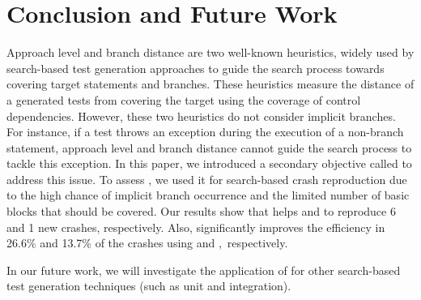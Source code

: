 \section{Conclusion and Future Work} 
\label{sec:bbc:confut}

Approach level and branch distance are two well-known heuristics, widely used by search-based test generation approaches to guide the search process towards covering target statements and branches. These heuristics measure the distance of a generated tests from covering the target using the coverage of control dependencies. However, these two heuristics do not consider implicit branches. For instance, if a test throws an exception during the execution of a non-branch statement, approach level and branch distance cannot guide the search process to tackle this exception. In this paper, we introduced a secondary objective called \bbc to address this issue. To assess \bbc, we used it for search-based crash reproduction due to the high chance of implicit branch occurrence and the limited number of basic blocks that should be covered.
Our results show that \bbc helps \integ and \WS to reproduce 6 and 1 new crashes, respectively.
Also, \bbc significantly improves the efficiency in 26.6\% and 13.7\% of the crashes using \integ and \WS,~respectively.

In our future work, we will investigate the application of \bbc for other search-based test generation techniques (such as unit and  integration).
\vspace{-1em}